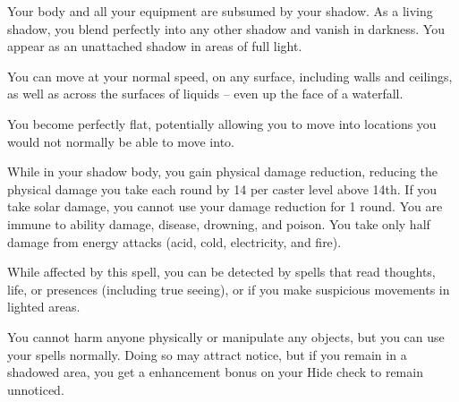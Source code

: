 \begin{spellheader}
    \begin{spelltargetinginfo}
    \end{spelltargetinginfo}
    \begin{spelleffects}
    \end{spelleffects}
\end{spellheader}
\begin{spellcontent}
    \spelleffect Your body and all your equipment are subsumed by your shadow. As a living shadow, you blend perfectly into any other shadow and vanish in darkness. You appear as an unattached shadow in areas of full light.
    \par You can move at your normal speed, on any surface, including walls and ceilings, as well as across the surfaces of liquids -- even up the face of a waterfall.
    \par You become perfectly flat, potentially allowing you to move into locations you would not normally be able to move into.
    \par While in your shadow body, you gain physical damage reduction, reducing the physical damage you take each round by 14  per caster level above 14th. If you take solar damage, you cannot use your damage reduction for 1 round. You are immune to ability damage, disease, drowning, and poison. You take only half damage from energy attacks (acid, cold, electricity, and fire).
    \par While affected by this spell, you can be detected by spells that read thoughts, life, or presences (including true seeing), or if you make suspicious movements in lighted areas.
    \par You cannot harm anyone physically or manipulate any objects, but you can use your spells normally. Doing so may attract notice, but if you remain in a shadowed area, you get a  enhancement bonus on your Hide check to remain unnoticed.
    \spelldur{\durmed \dismissable}
\end{spellcontent}
\begin{spellfooter}

\end{spellfooter}


